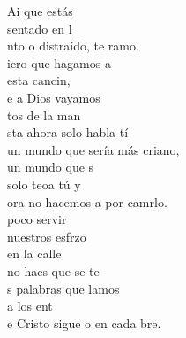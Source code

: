 \documentclass[12pt]{article}
\begin{document}
 
    \sffamily

    \portada[titulo=Cantoral, subtitulo=Grupo San Francisco Granada]
    \newpage
    \tableofcontents
    \newpage


    \begin{multicols*}{2}
        \begin{cancion}%
            Ai que estás \\
            sentado en l     \\
            nto o distraído, te ramo.\\
            iero que hagamos a \\
            esta cancin,\\
            e a Dios vayamos \\
            tos de la man\\
        \jump
            sta ahora solo habla tí\\
            un mundo que sería más criano,\\
             un mundo que s  \\
            solo teoa tú y \\
            ora no hacemos a por camrlo.\\
        \jump
             poco servir \\
            nuestros esfrzo\\
            en la calle \\
            no hacs que se te\\
            s palabras que lamos \\
            a los ent\\
            e Cristo sigue o en cada bre.\\

\end{cancion}
\end{multicols*}
\end{document}
